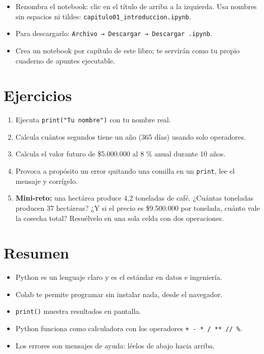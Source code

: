 \documentclass[
  spanish,
  letterpaper,
  DIV=11,
  numbers=noendperiod]{scrreprt}
\providecommand{\tightlist}{%
  \setlength{\itemsep}{0pt}\setlength{\parskip}{0pt}}
\begin{document}
\begin{itemize}
\tightlist
\item
  Renombra el notebook: clic en el título de arriba a la izquierda. Usa
  nombres sin espacios ni tildes:
  \texttt{capitulo01\_introduccion.ipynb}.
\item
  Para descargarlo:
  \texttt{Archivo\ →\ Descargar\ →\ Descargar\ .ipynb}.
\item
  Crea un notebook por capítulo de este libro; te servirán como tu
  propio cuaderno de apuntes ejecutable.
\end{itemize}

\section{Ejercicios}\label{ejercicios}

\begin{enumerate}
\def\labelenumi{\arabic{enumi}.}
\tightlist
\item
  Ejecuta \texttt{print("Tu\ nombre")} con tu nombre real.
\item
  Calcula cuántos segundos tiene un año (365 días) usando solo
  operadores.
\item
  Calcula el valor futuro de \$5.000.000 al 8 \% anual durante 10 años.
\item
  Provoca a propósito un error quitando una comilla en un
  \texttt{print}, lee el mensaje y corrígelo.
\item
  \textbf{Mini-reto:} una hectárea produce 4,2 toneladas de café.
  ¿Cuántas toneladas producen 37 hectáreas? ¿Y si el precio es
  \$9.500.000 por tonelada, cuánto vale la cosecha total? Resuélvelo en
  una sola celda con dos operaciones.
\end{enumerate}

\section{Resumen}\label{resumen}

\begin{itemize}
\tightlist
\item
  Python es un lenguaje claro y es el estándar en datos e ingeniería.
\item
  Colab te permite programar sin instalar nada, desde el navegador.
\item
  \texttt{print()} muestra resultados en pantalla.
\item
  Python funciona como calculadora con los operadores
  \texttt{+\ -\ *\ /\ **\ //\ \%}.
\item
  Los errores son mensajes de ayuda: léelos de abajo hacia arriba.
\end{itemize}
\end{document}
